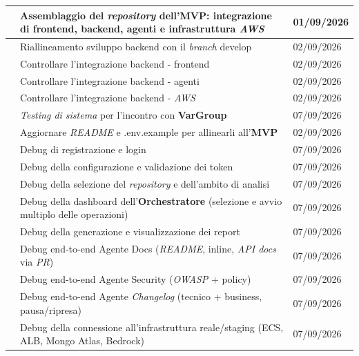 \documentclass[12pt, a4paper]{article}
\begin{document}
\begin{xltabular}{\textwidth}{|l|X|l|}
         & Assemblaggio del \textit{repository} dell'\textbf{MVP}: integrazione di frontend, backend, agenti e infrastruttura \textit{AWS} & 01/09/2026 \\ \hline
         & Riallineamento sviluppo backend con il \textit{branch} develop & 02/09/2026 \\ \hline
         & Controllare l'integrazione backend - frontend & 02/09/2026 \\ \hline
         & Controllare l'integrazione backend - agenti & 02/09/2026 \\ \hline
         & Controllare l'integrazione backend - \textit{AWS} & 02/09/2026 \\ \hline
         & \textit{Testing di sistema} per l'incontro con \textbf{VarGroup} & 07/09/2026 \\ \hline
         & Aggiornare \textit{README} e .env.example per allinearli all'\textbf{MVP} & 02/09/2026 \\ \hline
         & Debug di registrazione e login & 07/09/2026 \\ \hline
         & Debug della configurazione e validazione dei token & 07/09/2026 \\ \hline
         & Debug della selezione del \textit{repository} e dell'ambito di analisi & 07/09/2026 \\ \hline
         & Debug della dashboard dell'\textbf{Orchestratore} (selezione e avvio multiplo delle operazioni) & 07/09/2026 \\ \hline
         & Debug della generazione e visualizzazione dei report & 07/09/2026 \\ \hline
         & Debug end-to-end Agente Docs (\textit{README}, inline, \textit{API docs} via \textit{PR}) & 07/09/2026 \\ \hline
         & Debug end-to-end Agente Security (\textit{OWASP} + policy) & 07/09/2026 \\ \hline
         & Debug end-to-end Agente \textit{Changelog} (tecnico + business, pausa/ripresa) & 07/09/2026 \\ \hline
         & Debug della connessione all'infrastruttura reale/staging (ECS, ALB, Mongo Atlas, Bedrock) & 07/09/2026 \\ \hline

\end{xltabular}
\end{document}
